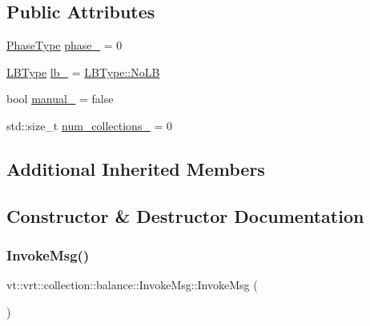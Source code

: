 \subsection*{Public Attributes}
\begin{DoxyCompactItemize}
\item 
\hyperlink{namespacevt_a46ce6733d5cdbd735d561b7b4029f6d7}{Phase\+Type} \hyperlink{structvt_1_1vrt_1_1collection_1_1balance_1_1_invoke_msg_a0649dc6323a462880a2e327509eeb21c}{phase\+\_\+} = 0
\item 
\hyperlink{namespacevt_1_1vrt_1_1collection_1_1balance_ac4f99693509affcc67db182d4aad9b5c}{L\+B\+Type} \hyperlink{structvt_1_1vrt_1_1collection_1_1balance_1_1_invoke_msg_ab3bba23a78a0b6d988e64949808d3137}{lb\+\_\+} = \hyperlink{namespacevt_1_1vrt_1_1collection_1_1balance_ac4f99693509affcc67db182d4aad9b5cad12268b59a4f1098aee001f9a1750020}{L\+B\+Type\+::\+No\+LB}
\item 
bool \hyperlink{structvt_1_1vrt_1_1collection_1_1balance_1_1_invoke_msg_a6461ced3c059040dbbaed0f809318af6}{manual\+\_\+} = false
\item 
std\+::size\+\_\+t \hyperlink{structvt_1_1vrt_1_1collection_1_1balance_1_1_invoke_msg_a10c7dcc893af9fdc8096575174e07441}{num\+\_\+collections\+\_\+} = 0
\end{DoxyCompactItemize}
\subsection*{Additional Inherited Members}


\subsection{Constructor \& Destructor Documentation}
\mbox{\label{structvt_1_1vrt_1_1collection_1_1balance_1_1_invoke_msg_a1a0857477e6d447a780f33d22e535478}} 
\subsubsection{\texorpdfstring{Invoke\+Msg()}{InvokeMsg()}\hspace{0.1cm}{\footnotesize\ttfamily [1/2]}}
{\footnotesize\ttfamily vt\+::vrt\+::collection\+::balance\+::\+Invoke\+Msg\+::\+Invoke\+Msg (\begin{DoxyParamCaption}{ }\end{DoxyParamCaption})\hspace{0.3cm}{\ttfamily [default]}}

